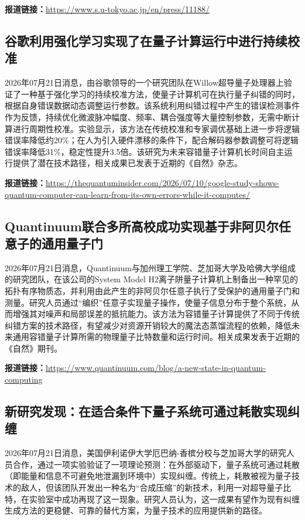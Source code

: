 \documentclass[12pt,a4paper]{ctexart}
\begin{document}
\noindent\textbf{报道链接：}\url{https://www.s.u-tokyo.ac.jp/en/press/11188/}

\subsection{ 谷歌利用强化学习实现了在量子计算运行中进行持续校准 }

2026年07月21日消息，由谷歌领导的一个研究团队在Willow超导量子处理器上验证了一种基于强化学习的持续校准方法，使量子计算机可在执行量子纠错的同时，根据自身错误数据动态调整运行参数。该系统利用纠错过程中产生的错误检测事件作为反馈，持续优化微波脉冲幅度、频率、耦合强度等大量控制参数，无需中断计算进行周期性校准。实验显示，该方法在传统校准和专家调优基础上进一步将逻辑错误率降低约20\%；在人为引入硬件漂移的条件下，配合解码器参数调整可将逻辑错误率降低31\%，稳定性提升3.5倍。该研究为未来容错量子计算机长时间自主运行提供了潜在技术路径，相关成果已发表于近期的《自然》杂志。

\noindent\textbf{报道链接：}\url{https://thequantuminsider.com/2026/07/10/google-study-shows-quantum-computer-can-learn-from-its-own-errors-while-it-computes/}

\subsection{ Quantinuum联合多所高校成功实现基于非阿贝尔任意子的通用量子门 }

2026年07月21日消息，Quantinuum与加州理工学院、芝加哥大学及哈佛大学组成的研究团队，在该公司的System Model H2离子阱量子计算机上制备出一种罕见的拓扑有序物质态，并利用由此产生的非阿贝尔任意子执行了受保护的通用量子门和测量。研究人员通过“编织”任意子实现量子操作，使量子信息分布于整个系统，从而增强其对噪声和局部误差的抵抗能力。该方法为容错量子计算提供了不同于传统纠错方案的技术路径，有望减少对资源开销较大的魔法态蒸馏流程的依赖，降低未来通用容错量子计算所需的物理量子比特数量和运行时间。相关成果发表于近期的《自然》期刊。

\noindent\textbf{报道链接：}\url{https://www.quantinuum.com/blog/a-new-state-in-quantum-computing}

\subsection{ 新研究发现：在适合条件下量子系统可通过耗散实现纠缠 }

2026年07月21日消息，美国伊利诺伊大学厄巴纳-香槟分校与芝加哥大学的研究人员合作，通过一项实验验证了一项理论预测：在外部驱动下，量子系统可通过耗散（即能量和信息不可避免地泄漏到环境中）实现纠缠。传统上，耗散被视为量子技术的敌人，但该团队开发出一种名为“合成压缩”的新技术，利用一对超导量子比特，在实验室中成功再现了这一现象。研究人员认为，这一成果有望作为现有纠缠生成方法的更稳健、可靠的替代方案，为量子技术的应用提供新的路径。
\end{document}
